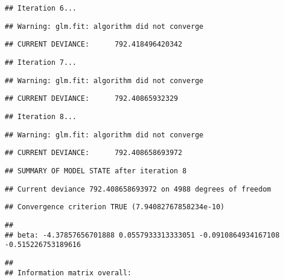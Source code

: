 \documentclass[
]{book}
\begin{document}
\begin{verbatim}
## Iteration 6...
\end{verbatim}

\begin{verbatim}
## Warning: glm.fit: algorithm did not converge
\end{verbatim}

\begin{verbatim}
## CURRENT DEVIANCE:      792.418496420342
\end{verbatim}

\begin{verbatim}
## Iteration 7...
\end{verbatim}

\begin{verbatim}
## Warning: glm.fit: algorithm did not converge
\end{verbatim}

\begin{verbatim}
## CURRENT DEVIANCE:      792.40865932329
\end{verbatim}

\begin{verbatim}
## Iteration 8...
\end{verbatim}

\begin{verbatim}
## Warning: glm.fit: algorithm did not converge
\end{verbatim}

\begin{verbatim}
## CURRENT DEVIANCE:      792.408658693972
\end{verbatim}

\begin{verbatim}
## SUMMARY OF MODEL STATE after iteration 8
\end{verbatim}

\begin{verbatim}
## Current deviance 792.408658693972 on 4988 degrees of freedom
\end{verbatim}

\begin{verbatim}
## Convergence criterion TRUE (7.94082767858234e-10)
\end{verbatim}

\begin{verbatim}
## 
## beta: -4.37857656701888 0.0557933313333051 -0.0910864934167108 -0.515226753189616
\end{verbatim}

\begin{verbatim}
## 
## Information matrix overall:
\end{verbatim}
\end{document}
